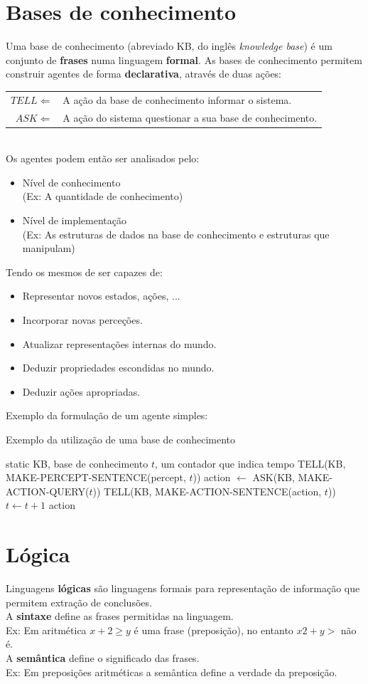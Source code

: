 \documentclass[]{report}
\begin{document}
\section{Bases de conhecimento}
Uma base de conhecimento (abreviado KB, do inglês \textit{knowledge base}) é um conjunto de \textbf{frases} numa linguagem \textbf{formal}.
As bases de conhecimento permitem construir agentes de forma \textbf{declarativa}, através de duas ações:\\
\begin{tabular}{r l}
$TELL \Leftarrow $ & A ação da base de conhecimento informar o sistema.\\
$ASK \Leftarrow $ & A ação do sistema questionar a sua base de conhecimento.
\end{tabular}\\[0.2cm]
Os agentes podem então ser analisados pelo:
\begin{itemize}
\item Nível de conhecimento\\
(Ex: A quantidade de conhecimento)
\item Nível de implementação\\
(Ex: As estruturas de dados na base de conhecimento e estruturas que manipulam)
\end{itemize}
Tendo os mesmos de ser capazes de:
\begin{itemize}
\item Representar novos estados, ações, ...
\item Incorporar novas perceções.
\item Atualizar representações internas do mundo.
\item Deduzir propriedades escondidas no mundo.
\item Deduzir ações apropriadas.
\end{itemize}
Exemplo da formulação de um agente simples:
\begin{algorithm}
\caption{Exemplo da utilização de uma base de conhecimento}
\begin{algorithmic}
\State    static KB, base de conhecimento
\State           $t$, um contador que indica tempo
\State    TELL(KB, MAKE-PERCEPT-SENTENCE(percept, $t$))
\State    action $\gets$ ASK(KB, MAKE-ACTION-QUERY($t$))
\State    TELL(KB, MAKE-ACTION-SENTENCE(action, $t$))
\State    $t \gets t + 1$
\State \Return action
\EndFunction
\end{algorithmic}
\end{algorithm}
\section{Lógica}
Linguagens \textbf{lógicas} são linguagens formais para representação de informação que permitem extração de conclusões.\\[0.2cm]
A \textbf{sintaxe} define as frases permitidas na linguagem.\\
\indent Ex: Em aritmética $x + 2 \geq y$ é uma frase (preposição), no entanto $x2 + y >$ não é.\\[0.2cm]
A \textbf{semântica} define o significado das frases.\\
\indent Ex: Em preposições aritméticas a semântica define a verdade da preposição.
\end{document}
